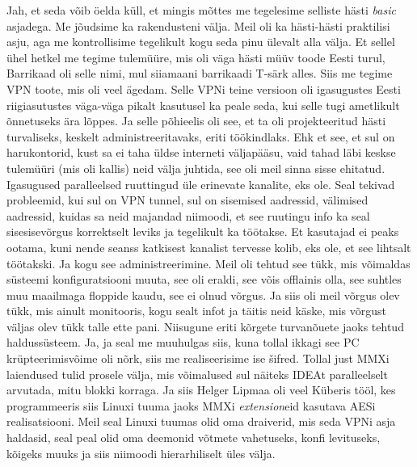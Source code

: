 Jah, et seda võib öelda küll, et mingis mõttes me tegelesime selliste hästi 
\emph{basic} asjadega. Me jõudsime ka rakendusteni välja. Meil oli ka 
hästi-hästi praktilisi asju, aga me kontrollisime tegelikult kogu seda pinu 
ülevalt alla välja. Et sellel ühel hetkel me tegime tulemüüre, mis oli väga 
hästi müüv toode Eesti turul, Barrikaad oli selle nimi, mul 
siiamaani barrikaadi T-särk alles. Siis me tegime VPN toote, mis oli veel 
ägedam. Selle VPNi teine versioon oli igasugustes Eesti riigiasutustes 
väga-väga pikalt kasutusel ka peale seda, kui selle tugi ametlikult õnnetuseks 
ära lõppes. Ja selle põhieelis oli see, et ta oli projekteeritud hästi 
turvaliseks, keskelt administreeritavaks, eriti töökindlaks. Ehk et see, et sul 
on  harukontorid, kust sa ei taha üldse interneti väljapääsu, vaid tahad läbi 
keskse tulemüüri (mis oli kallis) neid välja juhtida, see oli meil sinna sisse 
ehitatud. Igasugused paralleelsed ruuttingud üle erinevate kanalite, eks ole. 
Seal tekivad probleemid, kui sul on VPN tunnel, sul on  sisemised aadressid, 
välimised aadressid, kuidas sa neid majandad niimoodi, et see ruutingu info ka 
seal sisesisevõrgus korrektselt leviks ja tegelikult ka töötakse. Et kasutajad 
ei peaks  ootama, kuni nende seanss katkisest kanalist tervesse kolib, eks ole, 
et see lihtsalt töötakski. Ja kogu see administreerimine. Meil oli tehtud see 
tükk, mis võimaldas süsteemi konfiguratsiooni muuta, see oli eraldi, see võis 
offlainis olla, see suhtles  muu maailmaga floppide kaudu, see ei olnud võrgus. 
Ja siis oli meil võrgus olev tükk, mis ainult monitooris, kogu sealt infot ja 
täitis neid käske, mis võrgust väljas olev tükk talle  ette pani. Niisugune 
eriti kõrgete turvanõuete jaoks tehtud haldussüsteem. Ja, ja seal me muuhulgas 
siis, kuna tollal ikkagi see PC krüpteerimisvõime oli nõrk, siis me 
realiseerisime ise  šifred. Tollal just MMXi laiendused tulid prosele välja, 
mis võimalused sul näiteks IDEAt paralleelselt arvutada,  mitu blokki korraga. Ja siis 
Helger Lipmaa oli veel Küberis tööl, kes 
programmeeris siis Linuxi tuuma jaoks MMXi \emph{extension}eid  kasutava 
AESi  
realisatsiooni. Meil seal Linuxi tuumas olid oma draiverid, mis 
seda VPNi asja haldasid, seal peal olid  oma deemonid võtmete vahetuseks, konfi 
levituseks, kõigeks muuks  ja siis niimoodi hierarhiliselt üles välja.

